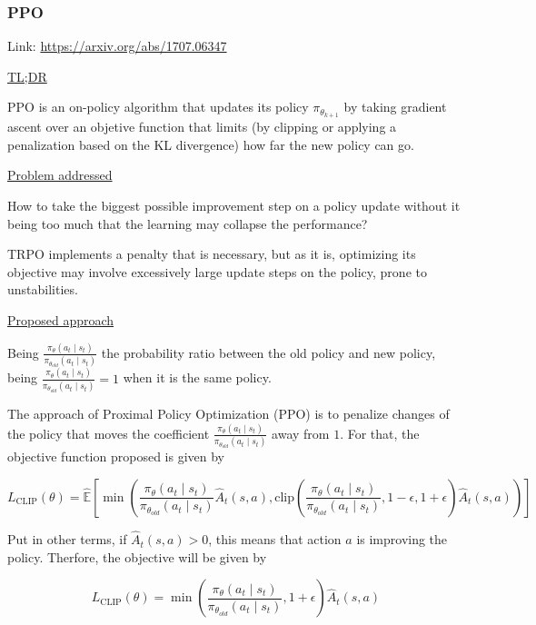 \documentclass[12pt, english]{article}
\begin{document}
\subsubsection{PPO}
\label{PPO}

Link: \url{https://arxiv.org/abs/1707.06347}

\underline{TL;DR}

PPO \cite{schulman_proximal_2017} is an on-policy algorithm that updates its policy $\pi_{\theta_{k+1}}$ by taking gradient ascent over an objetive function that limits (by clipping or applying a penalization based on the KL divergence) how far the new policy can go.

\underline{Problem addressed}

How to take the biggest possible improvement step on a policy update without it being too much that the learning may collapse the performance?

TRPO implements a penalty that is necessary, but as it is, optimizing its objective may involve excessively large update steps on the policy, prone to unstabilities.

\underline{Proposed approach}

Being $\frac{\pi_\theta(a_t \mid s_t)}{\pi_{\theta_{old}} (a_t \mid s_t)}$ the probability ratio between the old policy and new policy, being $\frac{\pi_\theta(a_t \mid s_t)}{\pi_{\theta_{old}} (a_t \mid s_t)} = 1$ when it is the same policy.

The approach of Proximal Policy Optimization (PPO) is to penalize changes of the policy that moves the coefficient $\frac{\pi_\theta(a_t \mid s_t)}{\pi_{\theta_{old}} (a_t \mid s_t)}$ away from $1$. For that, the objective function proposed is given by

\begin{equation}
  \label{eqn_clipped_objective}
  L_{\text{CLIP}} (\theta) = \hat{\mathbb{E}} [\min (\frac{\pi_\theta(a_t \mid s_t)}{\pi_{\theta_{old}} (a_t \mid s_t)} \hat{A}_t(s,a), \text{clip} (\frac{\pi_\theta(a_t \mid s_t)}{\pi_{\theta_{old}} (a_t \mid s_t)},1-\epsilon, 1+\epsilon) \hat{A}_t(s,a))]
\end{equation}

Put in other terms, if $\hat{A}_t(s,a) > 0$, this means that action $a$ is improving the policy. Therfore, the objective will be given by

\begin{equation*}
  L_{\text{CLIP}} (\theta) = \min (\frac{\pi_\theta(a_t \mid s_t)}{\pi_{\theta_{old}} (a_t \mid s_t)}, 1+\epsilon) \hat{A}_t(s,a)
\end{equation*}
\end{document}

